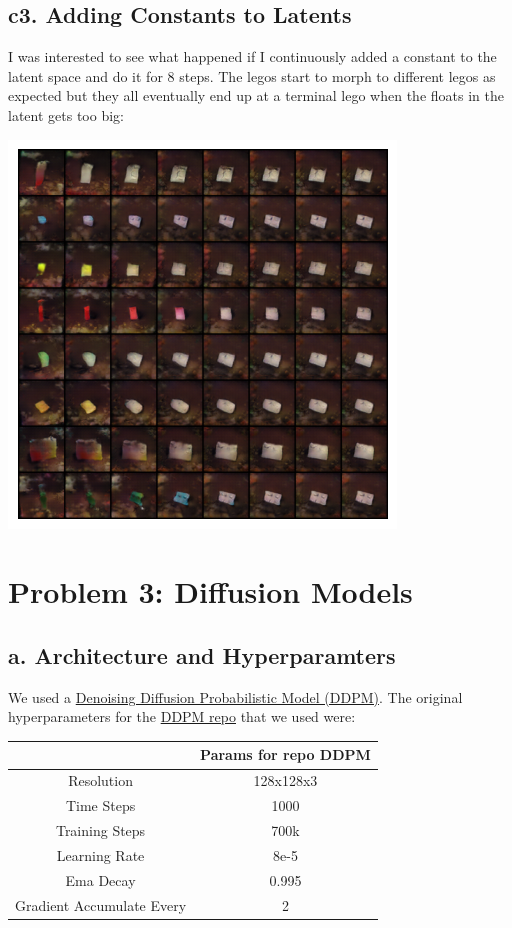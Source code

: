 \documentclass[]{article}
\begin{document}
\begin{center}
\end{center}

\newpage
\subsection*{c3. Adding Constants to Latents}
I was interested to see what happened if I continuously added a constant to the latent space and do it for 8 steps.
The legos start to morph to different legos as expected but
they all eventually end up at a terminal lego when the floats in the latent gets too big:
\begin{center}
\includegraphics[scale=1.5]{./imgs/gan_adding_constants}
\end{center}

\newpage
\section*{Problem 3: Diffusion Models}
\subsection*{a. Architecture and Hyperparamters}
We used a \href{https://arxiv.org/pdf/2006.11239.pdf}{Denoising Diffusion Probabilistic Model (DDPM)}. The original hyperparameters for
the \href{https://github.com/lucidrains/denoising-diffusion-pytorch}{DDPM repo} that we used were:
\begin{center}
\begin{tabular}{|c|c|}
\hline
& Params for repo DDPM \\ \hline
Resolution & 128x128x3 \\ \hline
Time Steps & 1000 \\ \hline
Training Steps & 700k \\ \hline
Learning Rate & 8e-5 \\ \hline
Ema Decay & 0.995 \\ \hline
Gradient Accumulate Every & 2 \\ \hline
\end{tabular}
\end{center}
\end{document}
